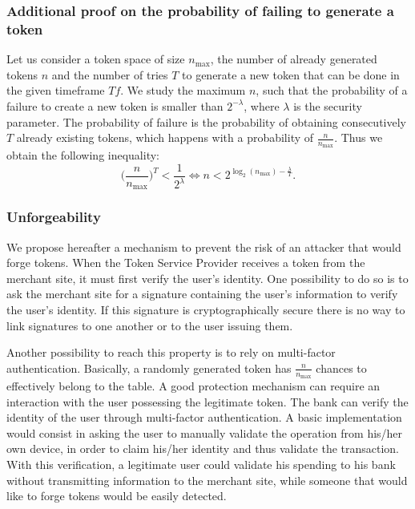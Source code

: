 \documentclass{llncs}
\newcounter{prob}
\begin{document}
\subsubsection{Additional proof on the probability of failing to generate a token}

Let us consider a token space of size $n_{\max}$, the number of already generated tokens $n$ and the number of tries $T$ to generate a new token that can be done in the given timeframe $Tf$. We study the maximum $n$, such that the probability of a failure to create a new token is smaller than $2^{-\lambda}$, where $\lambda$ is the security parameter. The probability of failure is the probability of obtaining consecutively $T$ already existing tokens, which happens with a probability of $\frac{n}{n_{\max}}$. Thus we obtain the following inequality:
\begin{equation}\label{eq:fill_rate}
\bigg(\frac{n}{n_{\max}}\bigg)^{T} <\frac{1}{2^\lambda}\iff
n <2^{\log_2(n_{\max})-\frac{\lambda}{T}}.
\end{equation}


\subsubsection{Unforgeability}\label{sect:unforgeability}

We propose hereafter a mechanism to prevent the risk of an attacker that would forge tokens. When the Token Service Provider receives a token from the merchant site, it must first verify the user's identity. One possibility to do so is to ask the merchant site for a signature containing the user's information to verify the user's identity. If this signature is cryptographically secure there is no way to link signatures to one another or to the user issuing them.

Another possibility to reach this property is to rely on multi-factor authentication. Basically, a randomly generated token has $\frac{n}{n_{\max}}$ chances to effectively belong to the table. A good protection mechanism can require an interaction with the user possessing the legitimate token. The bank can verify the identity of the user through multi-factor authentication. A basic implementation would consist in asking the user to manually validate the operation from his/her own device, in order to claim his/her identity and thus validate the transaction.
With this verification, a legitimate user could validate his spending to his bank without transmitting information to the merchant site, while someone that would like to forge tokens would be easily detected.
\end{document}
